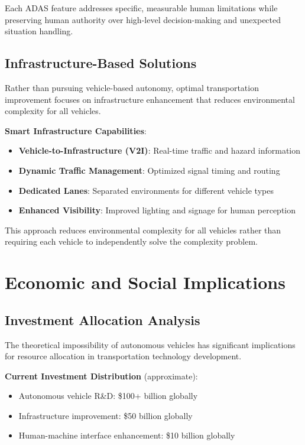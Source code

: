 \documentclass[12pt,a4paper]{article}
\begin{document}
Each ADAS feature addresses specific, measurable human limitations while preserving human authority over high-level decision-making and unexpected situation handling.

\subsection{Infrastructure-Based Solutions}

Rather than pursuing vehicle-based autonomy, optimal transportation improvement focuses on infrastructure enhancement that reduces environmental complexity for all vehicles.

\textbf{Smart Infrastructure Capabilities}:
\begin{itemize}
\item \textbf{Vehicle-to-Infrastructure (V2I)}: Real-time traffic and hazard information
\item \textbf{Dynamic Traffic Management}: Optimized signal timing and routing
\item \textbf{Dedicated Lanes}: Separated environments for different vehicle types
\item \textbf{Enhanced Visibility}: Improved lighting and signage for human perception
\end{itemize}

This approach reduces environmental complexity for all vehicles rather than requiring each vehicle to independently solve the complexity problem.

\section{Economic and Social Implications}

\subsection{Investment Allocation Analysis}

The theoretical impossibility of autonomous vehicles has significant implications for resource allocation in transportation technology development.

\textbf{Current Investment Distribution} (approximate):
\begin{itemize}
\item Autonomous vehicle R\&D: \$100+ billion globally
\item Infrastructure improvement: \$50 billion globally
\item Human-machine interface enhancement: \$10 billion globally
\end{itemize}
\end{document}
